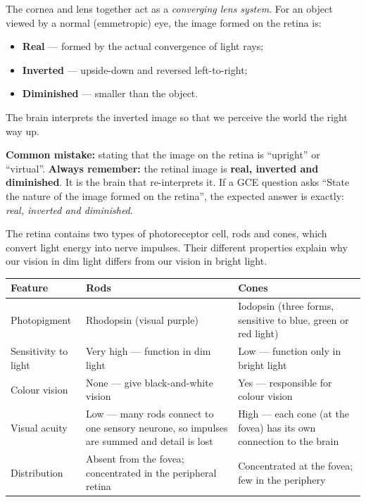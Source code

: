 \documentclass[11pt]{article}
\newcommand{\cle}[1]{{\popxbold\color{popdark}#1}}
\newcounter{popsec}
\newcounter{popsub}
\newcommand{\courssub}[1]{%
  \stepcounter{popsub}%
  \par\vspace{9pt}\noindent{\popxbold\fontsize{11.5}{13}\selectfont\color{popink}{\color{poporange}\thepopsec.\thepopsub}\hspace{6pt}#1}\par\nopagebreak\vspace{4pt}
}
\begin{document}
\begin{propriete}
The cornea and lens together act as a \emph{converging lens system}. For an object viewed by a normal (emmetropic) eye, the image formed on the retina is:
\begin{itemize}
\item \textbf{Real} --- formed by the actual convergence of light rays;
\item \textbf{Inverted} --- upside-down and reversed left-to-right;
\item \textbf{Diminished} --- smaller than the object.
\end{itemize}
The brain interprets the inverted image so that we perceive the world the right way up.
\end{propriete}

\begin{attention}
\textbf{Common mistake:} stating that the image on the retina is ``upright'' or ``virtual''. \textbf{Always remember:} the retinal image is \textbf{real, inverted and diminished}. It is the brain that re-interprets it. If a GCE question asks ``State the nature of the image formed on the retina'', the expected answer is exactly: \emph{real, inverted and diminished}.
\end{attention}

\courssub{The Retina: Rods and Cones}

The retina contains two types of photoreceptor cell, \cle{rods} and \cle{cones}, which convert light energy into nerve impulses. Their different properties explain why our vision in dim light differs from our vision in bright light.

\begin{center}
\begin{tabularx}{\linewidth}{|l|X|X|}\hline
\rowcolor{popblueL}
\textbf{Feature} & \textbf{Rods} & \textbf{Cones} \\ \hline
\cle{Photopigment} & Rhodopsin (visual purple) & Iodopsin (three forms, sensitive to blue, green or red light) \\ \hline
\cle{Sensitivity to light} & Very high --- function in dim light & Low --- function only in bright light \\ \hline
\cle{Colour vision} & None --- give black-and-white vision & Yes --- responsible for colour vision \\ \hline
\cle{Visual acuity} & Low --- many rods connect to one sensory neurone, so impulses are summed and detail is lost & High --- each cone (at the fovea) has its own connection to the brain \\ \hline
\cle{Distribution} & Absent from the fovea; concentrated in the peripheral retina & Concentrated at the \cle{fovea}; few in the periphery \\ \hline
\end{tabularx}
\end{center}
\end{document}
